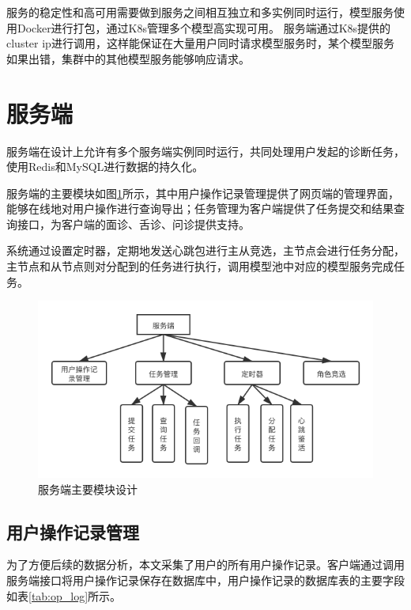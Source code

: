 服务的稳定性和高可用需要做到服务之间相互独立和多实例同时运行，模型服务使用Docker进行打包，通过K8s管理多个模型高实现可用。
服务端通过K8s提供的cluster ip进行调用，这样能保证在大量用户同时请求模型服务时，某个模型服务如果出错，集群中的其他模型服务能够响应请求。


\section{服务端}

服务端在设计上允许有多个服务端实例同时运行，共同处理用户发起的诊断任务，使用Redis和MySQL进行数据的持久化。

服务端的主要模块如图\ref{fig:server}所示，其中用户操作记录管理提供了网页端的管理界面，能够在线地对用户操作进行查询导出；任务管理为客户端提供了任务提交和结果查询接口，为客户端的面诊、舌诊、问诊提供支持。

系统通过设置定时器，定期地发送心跳包进行主从竞选，主节点会进行任务分配，主节点和从节点则对分配到的任务进行执行，调用模型池中对应的模型服务完成任务。


\begin{figure}[ht]
    \centering
    \includegraphics[width=12cm]{images/server7.png}
    \caption{服务端主要模块设计}
    \label{fig:server}
\end{figure}


\subsection{用户操作记录管理}
为了方便后续的数据分析，本文采集了用户的所有用户操作记录。客户端通过调用服务端接口将用户操作记录保存在数据库中，用户操作记录的数据库表的主要字段如表\ref{tab:op_log}所示。

